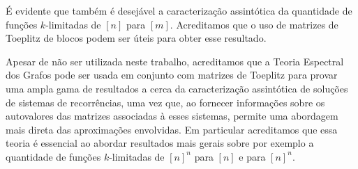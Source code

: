 \documentclass[a4paper,12pt]{article}
\theoremstyle{definition}
\begin{document}
É evidente que também é desejável a caracterização assintótica da quantidade de funções $k$-limitadas de $[n]$ para $[m]$. Acreditamos que o uso de matrizes de Toeplitz de blocos podem ser úteis para obter esse resultado.

Apesar de não ser utilizada neste trabalho, acreditamos que a Teoria Espectral dos Grafos pode ser usada em conjunto com matrizes de Toeplitz para provar uma ampla gama de resultados a cerca da caracterização assintótica de soluções de sistemas de recorrências, uma vez que, ao fornecer informações sobre os autovalores das matrizes associadas à esses sistemas, permite uma abordagem mais direta das aproximações envolvidas. Em particular acreditamos que essa teoria é essencial ao abordar resultados mais gerais sobre por exemplo a quantidade de funções $k$-limitadas de $[n]^n$ para $[n]$ e para $[n]^n$.

\newpage
\normalsize

\end{document}
